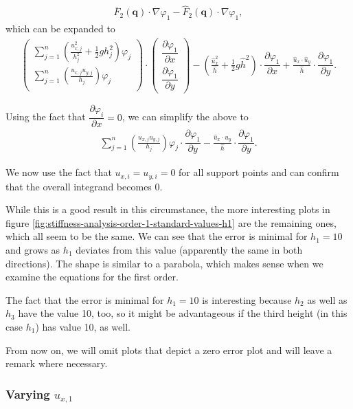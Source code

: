\documentclass[a4paper, twoside]{article}
\newcommand{\pd}[2]{\dfrac{\partial #1}{\partial #2}}
\renewcommand{\phi}{\varphi}
\begin{document}
\begin{align*}
  \overline{F}_2(\mathbf{q}) \cdot \nabla \phi_1 - \widehat{F}_2(\mathbf{q}) \cdot \nabla \phi_1,
\end{align*}
which can be expanded to
\begin{align*}
  \begin{pmatrix}
    \sum_{j=1}^n \left(\frac{u_{x,j}^2}{h_j^2} + \frac{1}{2} g h_j^2\right) \phi_j \\
    \sum_{j=1}^n \left(\frac{u_{x,j} u_{y,j}}{h_j}\right) \phi_j \\
  \end{pmatrix}
  \cdot
  \begin{pmatrix}
    \pd{\phi_1}{x} \\
    \pd{\phi_1}{y}
  \end{pmatrix} -
  \left( \frac{\widehat{u}_x^2}{\widehat{h}} + \frac{1}{2} g \widehat{h}^2 \right) \cdot \pd{\phi_1}{x} +
  \frac{\widehat{u}_x \cdot \widehat{u}_y }{\widehat{h}} \cdot \pd{\phi_1}{y}.
\end{align*}

Using the fact that $\pd{\phi_i}x = 0$, we can simplify the above to
\begin{align*}
    \sum_{j=1}^n \left(\frac{u_{x,j} u_{y,j}}{h_j}\right) \phi_j
    \cdot
    \pd{\phi_1}{y} -
    \frac{\widehat{u}_x \cdot \widehat{u}_y }{\widehat{h}} \cdot \pd{\phi_1}{y}.
\end{align*}

We now use the fact that $u_{x,i}=u_{y,i}=0$ for all support points and can confirm that the overall integrand becomes 0.

While this is a good result in this circumstance, the more interesting plots in figure \ref{fig:stiffness-analysis-order-1-standard-values-h1} are the remaining ones, which all seem to be the same. We can see that the error is minimal for $h_1=10$ and grows as $h_1$ deviates from this value (apparently the same in both directions). The shape is similar to a parabola, which makes sense when we examine the equations for the first order.

The fact that the error is minimal for $h_1=10$ is interesting because $h_2$ as well as $h_3$ have the value 10, too, so it might be advantageous if the third height (in this case $h_1$) has value 10, as well.

From now on, we will omit plots that depict a zero error plot and will leave a remark where necessary.

\subsubsection{\texorpdfstring{Varying $u_{x,1}$}{Varying ux1}}
\end{document}
